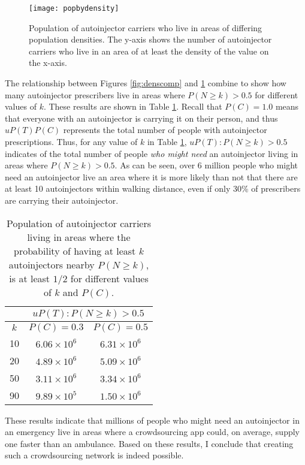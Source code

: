 \begin{figure}[h]
\centering
\texttt{[image: popbydensity]}
\caption{Population of autoinjector carriers who live in areas of differing population densities. The y-axis shows the number of autoinjector carriers who live in an area of at least the density of the value on the x-axis.}
\label{fig:popbydensity}
\end{figure}

The relationship between Figures \ref{fig:denscomp} and \ref{fig:popbydensity} combine to show how many autoinjector prescribers live in areas where $P(N \geq k) > 0.5$ for different values of $k$. These results are shown in Table \ref{tab:probsforks}. Recall that $P(C) = 1.0$ means that everyone with an autoinjector is carrying it on their person, and thus $uP(T)P(C)$ represents the total number of people with autoinjector prescriptions. Thus, for any value of $k$ in Table \ref{tab:probsforks}, $uP(T) : P(N\geq k) > 0.5$ indicates of the total number of people \textit{who might need} an autoinjector living in areas where $P(N \geq k) > 0.5$. As can be seen, over 6 million people who might need an autoinjector live an area where it is more likely than not that there are at least 10 autoinjectors within walking distance, even if only 30\% of prescribers are carrying their autoinjector.

\begin{table}[h]
\centering
\begin{tabular} {|c||c|c|}
    \hline
    & \multicolumn{2}{|c|}{$uP(T) : P(N\geq k) > 0.5$} \\\hline
    $k$ & $P(C) = 0.3$ & $P(C) = 0.5$ \\\hline\hline
    10 & $6.06 \times 10^{6}$ & $6.31 \times 10^{6}$ \\\hline
    20 & $4.89 \times 10^{6}$ & $5.09 \times 10^{6}$ \\\hline
    50 & $3.11 \times 10^{6}$ & $3.34 \times 10^{6}$ \\\hline
    90 & $9.89 \times 10^{5}$ & $1.50 \times 10^{6}$ \\\hline 
\end{tabular}
\caption{Population of autoinjector carriers living in areas where the probability of having at least $k$ autoinjectors nearby $P(N \geq k)$, is at least $1/2$ for different values of $k$ and $P(C)$.}
\label{tab:probsforks}
\end{table}

These results indicate that millions of people who might need an autoinjector in an emergency live in areas where a crowdsourcing app could, on average, supply one faster than an ambulance. Based on these results, I conclude that creating such a crowdsourcing network is indeed possible.
